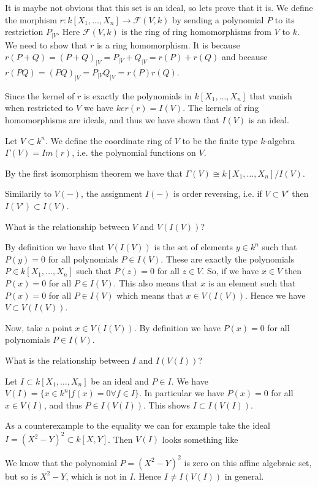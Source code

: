 It is maybe not obvious that this set is an ideal, so lets prove that it is. We define the morphism $r:k[X_1, \ldots, X_n] \longrightarrow \mathcal{F}(V, k)$ by sending a polynomial $P$ to its restriction $P_{\vert V}$. Here $\mathcal{F}(V, k)$ is the ring of ring homomorphisms from $V$ to $k$. We need to show that $r$ is a ring homomorphism. It is because $r(P+Q) = (P+Q)_{\vert V} = P_{\vert V} + Q_{\vert V} = r(P)+r(Q)$ and because $r(PQ) = (PQ)_{\vert V} = P_{\vert V}Q_{\vert V} = r(P)r(Q)$. 

Since the kernel of $r$ is exactly the polynomials in $k[X_1, \ldots, X_n]$ that vanish when restricted to $V$ we have $ker(r) = I(V)$. The kernels of ring homomorphisms are ideals, and thus we have shown that $I(V)$ is an ideal. 

\begin{definition}
Let $V\subset k^n$. We define the coordinate ring of $V$ to be the finite type $k$-algebra $\Gamma(V)= Im(r)$, i.e. the polynomial functions on $V$. 
\end{definition}

By the first isomorphism theorem we have that $\Gamma(V) \cong k[X_1, \ldots, X_n]/I(V)$. 

Similarily to $V(-)$, the assignment $I(-)$ is order reversing, i.e. if $V\subset V'$ then $I(V')\subset I(V)$. 

\begin{problem}
What is the relationship between $V$ and $V(I(V))$?
\end{problem}
\begin{solution}
By definition we have that $V(I(V))$ is the set of elements $y\in k^n$ such that $P(y) = 0$ for all polynomials $P\in I(V)$. These are exactly the polynomials $P\in k[X_1, \ldots, X_n]$ such that $P(z)=0$ for all $z\in V$. So, if we have $x\in V$ then $P(x)=0$ for all $P\in I(V)$. This also means that $x$ is an element such that $P(x)=0$ for all $P\in I(V)$ which means that $x\in V(I(V))$. Hence we have $V\subset V(I(V))$.  

Now, take a point $x\in V(I(V))$. By definition we have $P(x)=0$ for all polynomials $P\in I(V)$. 
\end{solution}

\begin{problem}
What is the relationship between $I$ and $I(V(I))$?
\end{problem}
\begin{solution}
Let $I\subset k[X_1, \ldots, X_n]$ be an ideal and $P\in I$. We have $V(I) = \{ x\in k^n \vert f(x)=0 \forall f\in I\}$. In particular we have $P(x)=0$ for all $x\in V(I)$, and thus $P\in I(V(I))$. This shows $I\subset I(V(I))$.

As a counterexample to the equality we can for example take the ideal $I=(X^2-Y)^2\subset k[X, Y]$. Then $V(I)$ looks something like 
\begin{center}
\def\svgwidth{0.4\textwidth}

\end{center}
We know that the polynomial $P=(X^2-Y)^2$ is zero on this affine algebraic set, but so is $X^2-Y$, which is not in $I$. Hence $I\neq I(V(I))$ in general. 
\end{solution}

